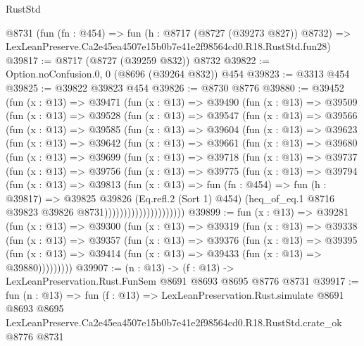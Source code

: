 \begin{lexlean}{RustStd}
\begin{coremodule}
    @8731
    (fun (fn : @454) =>
    fun (h : @8717 (@8727 (@39273 @827)) @8732) =>
    LexLeanPreserve.Ca2e45ea4507e15b0b7e41e2f98564cd0.R18.RustStd.fun28)
@39817 := @8717 (@8727 (@39259 @832)) @8732
@39822 := Option.noConfusion.{0, 0} (@8696 (@39264 @832)) @454
@39823 := @3313 @454
@39825 := @39822 @39823 @454
@39826 := @8730 @8776
@39880 := @39452
    (fun (x : @13) =>
    @39471
      (fun (x : @13) =>
      @39490
        (fun (x : @13) =>
        @39509
          (fun (x : @13) =>
          @39528
            (fun (x : @13) =>
            @39547
              (fun (x : @13) =>
              @39566
                (fun (x : @13) =>
                @39585
                  (fun (x : @13) =>
                  @39604
                    (fun (x : @13) =>
                    @39623
                      (fun (x : @13) =>
                      @39642
                        (fun (x : @13) =>
                        @39661
                          (fun (x : @13) =>
                          @39680
                            (fun (x : @13) =>
                            @39699
                              (fun (x : @13) =>
                              @39718
                                (fun (x : @13) =>
                                @39737
                                  (fun (x : @13) =>
                                  @39756
                                    (fun (x : @13) =>
                                    @39775
                                      (fun (x : @13) =>
                                      @39794
                                        (fun (x : @13) =>
                                        @39813
                                          (fun (x : @13) =>
                                          fun (fn : @454) =>
                                          fun (h : @39817) =>
                                          @39825
                                            @39826
                                            (Eq.refl.{2} (Sort 1) @454)
                                            (heq_of_eq.{1}
                                              @8716
                                              @39823
                                              @39826
                                              @8731)))))))))))))))))))))
@39899 := fun (x : @13) =>
  @39281
    (fun (x : @13) =>
    @39300
      (fun (x : @13) =>
      @39319
        (fun (x : @13) =>
        @39338
          (fun (x : @13) =>
          @39357
            (fun (x : @13) =>
            @39376
              (fun (x : @13) =>
              @39395
                (fun (x : @13) => @39414 (fun (x : @13) => @39433 (fun (x : @13) => @39880)))))))))
@39907 := (n : @13) -> (f : @13) -> LexLeanPreservation.Rust.FunSem @8691 @8693 @8695 @8776 @8731
@39917 := fun (n : @13) =>
  fun (f : @13) =>
  LexLeanPreservation.Rust.simulate
    @8691
    @8693
    @8695
    LexLeanPreserve.Ca2e45ea4507e15b0b7e41e2f98564cd0.R18.RustStd.crate_ok
    @8776
    @8731
\end{coremodule}
\end{lexlean}
